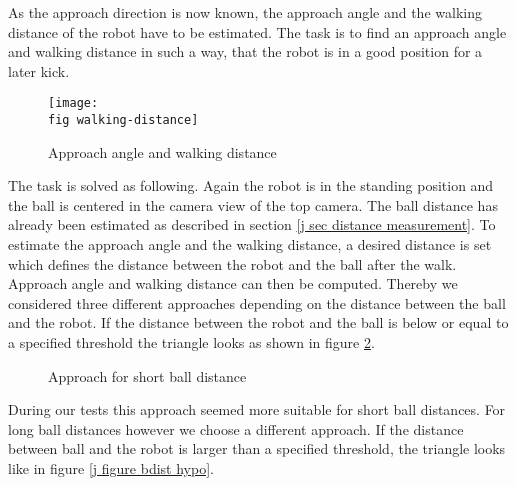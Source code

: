 As the approach direction is now known, the approach angle and the walking
distance of the robot have to be estimated. The task is to find an approach
angle and walking distance in such a way, that the robot is in a good position
for a later kick.

\begin{figure}[ht]
  \texttt{[image: \\fig walking-distance]}
  \caption{Approach angle and walking distance}
  \label{j figure approach angle and walking distance}
\end{figure}


The task is solved as following. Again the robot is in the standing position
and the ball is centered in the camera view of the top camera. The ball
distance has already been estimated as described in section \ref{j sec distance
  measurement}. To estimate the approach angle and the walking distance, a
desired distance is set which defines the distance between the robot and
the ball after the walk. Approach angle and walking distance can then be
computed. Thereby we considered three different approaches depending on the
distance between the ball and the robot. If the distance between the robot and
the ball is below or equal to a specified threshold the triangle looks as shown
in figure \ref{j figure rdist hypo}.

\begin{figure}[ht]
  \centering
  \caption{Approach for short ball distance}
  \label{j figure rdist hypo}
\end{figure}


During our tests this approach seemed more suitable for short ball distances.
For long ball distances however we choose a different approach. If the distance
between ball and the robot is larger than a specified threshold, the triangle
looks like in figure \ref{j figure bdist hypo}.

